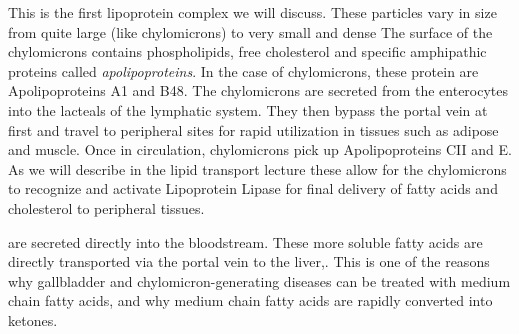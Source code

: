 \documentclass{tufte-handout}
\begin{document}
  This is the first lipoprotein complex we will discuss.  These particles vary in size from quite large (like chylomicrons) to very small and dense  The surface of the chylomicrons contains phospholipids, free cholesterol and specific amphipathic proteins called \emph{apolipoproteins}.  In the case of chylomicrons, these protein are Apolipoproteins A1 and B48.  The chylomicrons are secreted from the enterocytes into the lacteals of the lymphatic system.  They then bypass the portal vein at first and travel to peripheral sites for rapid utilization in tissues such as adipose and muscle.  Once in circulation, chylomicrons pick up Apolipoproteins CII and E.  As we will describe in the lipid transport lecture these allow for the chylomicrons to recognize and activate Lipoprotein Lipase for final delivery of fatty acids and cholesterol to peripheral tissues.  

 are secreted directly into the bloodstream.  These more soluble fatty acids are directly transported via the portal vein to the liver,.  This is one of the reasons why gallbladder and chylomicron-generating diseases can be treated with medium chain fatty acids, and why medium chain fatty acids are rapidly converted into ketones.




\end{document}
